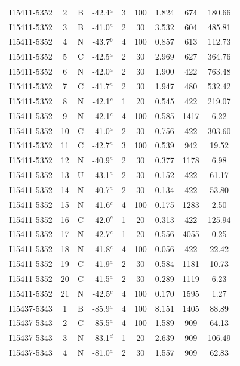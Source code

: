 \begin{table}
\begin{tabular}{ccccccccc}
I15411-5352 & 2 & B & -42.4$^{a}$ & 3 & 100 & 1.824 & 674 & 180.66 \\
I15411-5352 & 3 & B & -41.0$^{a}$ & 2 & 30 & 3.532 & 604 & 485.81 \\
I15411-5352 & 4 & N & -43.7$^{b}$ & 4 & 100 & 0.857 & 613 & 112.73 \\
I15411-5352 & 5 & C & -42.5$^{a}$ & 2 & 30 & 2.969 & 627 & 364.76 \\
I15411-5352 & 6 & N & -42.0$^{a}$ & 2 & 30 & 1.900 & 422 & 763.48 \\
I15411-5352 & 7 & C & -41.7$^{a}$ & 2 & 30 & 1.947 & 480 & 532.42 \\
I15411-5352 & 8 & N & -42.1$^{c}$ & 1 & 20 & 0.545 & 422 & 219.07 \\
I15411-5352 & 9 & N & -42.1$^{c}$ & 4 & 100 & 0.585 & 1417 & 6.22 \\
I15411-5352 & 10 & C & -41.0$^{a}$ & 2 & 30 & 0.756 & 422 & 303.60 \\
I15411-5352 & 11 & C & -42.7$^{a}$ & 3 & 100 & 0.539 & 942 & 19.52 \\
I15411-5352 & 12 & N & -40.9$^{a}$ & 2 & 30 & 0.377 & 1178 & 6.98 \\
I15411-5352 & 13 & U & -43.1$^{a}$ & 2 & 30 & 0.152 & 422 & 61.17 \\
I15411-5352 & 14 & N & -40.7$^{a}$ & 2 & 30 & 0.134 & 422 & 53.80 \\
I15411-5352 & 15 & N & -41.6$^{c}$ & 4 & 100 & 0.175 & 1283 & 2.50 \\
I15411-5352 & 16 & C & -42.0$^{c}$ & 1 & 20 & 0.313 & 422 & 125.94 \\
I15411-5352 & 17 & N & -42.7$^{c}$ & 1 & 20 & 0.556 & 4055 & 0.25 \\
I15411-5352 & 18 & N & -41.8$^{c}$ & 4 & 100 & 0.056 & 422 & 22.42 \\
I15411-5352 & 19 & C & -41.9$^{a}$ & 2 & 30 & 0.584 & 1181 & 10.73 \\
I15411-5352 & 20 & C & -41.5$^{a}$ & 2 & 30 & 0.289 & 1119 & 6.23 \\
I15411-5352 & 21 & N & -42.5$^{c}$ & 4 & 100 & 0.170 & 1595 & 1.27 \\
I15437-5343 & 1 & B & -85.9$^{a}$ & 4 & 100 & 8.151 & 1405 & 88.89 \\
I15437-5343 & 2 & C & -85.5$^{a}$ & 4 & 100 & 1.589 & 909 & 64.13 \\
I15437-5343 & 3 & N & -83.1$^{d}$ & 1 & 20 & 2.639 & 909 & 106.49 \\
I15437-5343 & 4 & N & -81.0$^{a}$ & 2 & 30 & 1.557 & 909 & 62.83 \\

\end{tabular}
\end{table}
